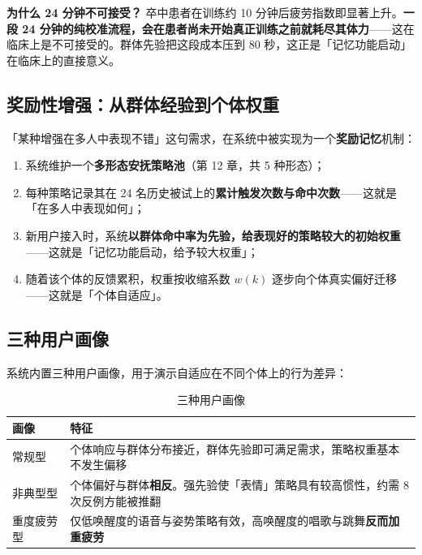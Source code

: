 \documentclass[11pt, a4paper]{ctexart}
\begin{document}
\begin{warnbox}
\textbf{为什么 24 分钟不可接受？} 卒中患者在训练约 10 分钟后疲劳指数即显著上升。\textbf{一段 24 分钟的纯校准流程，会在患者尚未开始真正训练之前就耗尽其体力}——这在临床上是不可接受的。群体先验把这段成本压到 80 秒，这正是「记忆功能启动」在临床上的直接意义。
\end{warnbox}

\subsection{奖励性增强：从群体经验到个体权重}

「某种增强在多人中表现不错」这句需求，在系统中被实现为一个\textbf{奖励记忆}机制：

\begin{enumerate}[itemsep=3pt, topsep=4pt]
  \item 系统维护一个\textbf{多形态安抚策略池}（第 12 章，共 5 种形态）；
  \item 每种策略记录其在 24 名历史被试上的\textbf{累计触发次数与命中次数}——这就是「在多人中表现如何」；
  \item 新用户接入时，系统\textbf{以群体命中率为先验，给表现好的策略较大的初始权重}——这就是「记忆功能启动，给予较大权重」；
  \item 随着该个体的反馈累积，权重按收缩系数 $w(k)$ 逐步向个体真实偏好迁移——这就是「个体自适应」。
\end{enumerate}

\subsection{三种用户画像}

系统内置三种用户画像，用于演示自适应在不同个体上的行为差异：

\begin{table}[htbp]
\centering
\caption{三种用户画像}
\begin{tabularx}{\textwidth}{@{}l X@{}}
\toprule
\sffamily\bfseries 画像 & \sffamily\bfseries 特征 \\
\midrule
常规型     & 个体响应与群体分布接近，群体先验即可满足需求，策略权重基本不发生偏移 \\
非典型型   & 个体偏好与群体\textbf{相反}。强先验使「表情」策略具有较高惯性，约需 8 次反例方能被推翻 \\
重度疲劳型 & 仅低唤醒度的语音与姿势策略有效，高唤醒度的唱歌与跳舞\textbf{反而加重疲劳} \\
\bottomrule
\end{tabularx}
\end{table}
\end{document}
